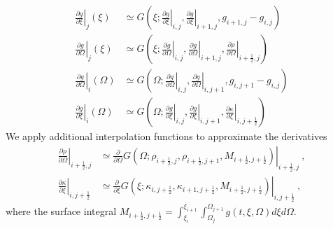 \begin{equation}
    \begin{aligned}
       \left.\frac{\partial g}{\partial \xi}\right|_{j}(\xi)
        &\simeq G\left(\xi;\left.\frac{\partial g}{\partial \xi}\right|_{i,j},\left.\frac{\partial g}{\partial \xi}\right|_{i+1,j},g_{i+1,j}-g_{i,j}\right)
        \\
        \left.\frac{\partial g}{\partial \Omega}\right|_{j}(\xi)
         &\simeq G\left(\xi;\left.\frac{\partial g}{\partial \Omega}\right|_{i,j},\left.\frac{\partial g}{\partial \Omega}\right|_{i+1,j},    \left.\frac{\partial \rho}{\partial \Omega}\right|_{i+\frac{1}{2},j}\right)
         \\
         \left.\frac{\partial g}{\partial \Omega}\right|_{i}(\Omega) 
     &\simeq G\left(\Omega;\left.\frac{\partial g}{\partial \Omega}\right|_{i,j},\left.\frac{\partial g}{\partial \Omega}\right|_{i,j+1},g_{i,j+1}-g_{i,j}\right)\\
         \left.\frac{\partial g}{\partial \xi}\right|_{i}(\Omega) 
  &\simeq G\left(\Omega;\left.\frac{\partial g}{\partial \xi}\right|_{i,j},\left.\frac{\partial g}{\partial \xi}\right|_{i,j+1},\left.\frac{\partial \kappa}{\partial \xi}\right|_{i,j+\frac{1}{2}}\right)
    \end{aligned}
\end{equation}
We apply additional interpolation functions to approximate 
the derivatives
\begin{equation}
    \begin{aligned}
    \left.\frac{\partial \rho}{\partial \Omega}\right|_{i+\frac{1}{2},j}
    &\simeq \left.\frac{\partial}{\partial \Omega} G(\Omega;\rho_{i+\frac{1}{2},j},\rho_{i+\frac{1}{2},j+1}, M_{i+\frac{1}{2},j+\frac{1}{2}})\right|_{i+\frac{1}{2},j}~, \\
    \left.\frac{\partial \kappa}{\partial \xi}\right|_{i,j+\frac{1}{2}}
 &\simeq \left.\frac{\partial}{\partial \xi} G(\xi;\kappa_{i,j+\frac{1}{2}},\kappa_{i+1,j+\frac{1}{2}}, M_{i+\frac{1}{2},j+\frac{1}{2}})\right|_{i,j+\frac{1}{2}}~,
    \end{aligned}
\end{equation} 
where the surface integral $M_{i+\frac{1}{2},j+\frac{1}{2}}=\int_{\xi_i}^{\xi_{i+1}}\int_{\Omega_j}^{\Omega_{j+1}}g(t,\xi,\Omega)d\xi d\Omega$.
